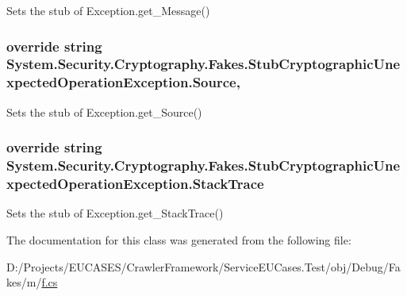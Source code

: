 Sets the stub of Exception.\-get\-\_\-\-Message()

\hypertarget{class_system_1_1_security_1_1_cryptography_1_1_fakes_1_1_stub_cryptographic_unexpected_operation_exception_a8462caeb9f0552f55eb74394362f0e9c}{
\subsubsection[{Source}]{\setlength{\rightskip}{0pt plus 5cm}override string System.\-Security.\-Cryptography.\-Fakes.\-Stub\-Cryptographic\-Unexpected\-Operation\-Exception.\-Source\hspace{0.3cm}{\ttfamily [get]}, {\ttfamily [set]}}}\label{class_system_1_1_security_1_1_cryptography_1_1_fakes_1_1_stub_cryptographic_unexpected_operation_exception_a8462caeb9f0552f55eb74394362f0e9c}


Sets the stub of Exception.\-get\-\_\-\-Source()

\hypertarget{class_system_1_1_security_1_1_cryptography_1_1_fakes_1_1_stub_cryptographic_unexpected_operation_exception_a6d1cd0be3e1a1183f007a2b4980817f3}{
\subsubsection[{Stack\-Trace}]{\setlength{\rightskip}{0pt plus 5cm}override string System.\-Security.\-Cryptography.\-Fakes.\-Stub\-Cryptographic\-Unexpected\-Operation\-Exception.\-Stack\-Trace\hspace{0.3cm}{\ttfamily [get]}}}\label{class_system_1_1_security_1_1_cryptography_1_1_fakes_1_1_stub_cryptographic_unexpected_operation_exception_a6d1cd0be3e1a1183f007a2b4980817f3}


Sets the stub of Exception.\-get\-\_\-\-Stack\-Trace()



The documentation for this class was generated from the following file\-:\begin{DoxyCompactItemize}
\item 
D\-:/\-Projects/\-E\-U\-C\-A\-S\-E\-S/\-Crawler\-Framework/\-Service\-E\-U\-Cases.\-Test/obj/\-Debug/\-Fakes/m/\hyperlink{m_2f_8cs}{f.\-cs}\end{DoxyCompactItemize}
